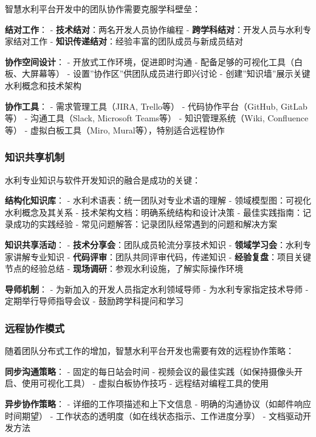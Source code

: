 智慧水利平台开发中的团队协作需要克服学科壁垒：

\textbf{结对工作}： - \textbf{技术结对}：两名开发人员协作编程 -
\textbf{跨学科结对}：开发人员与水利专家结对工作 -
\textbf{知识传递结对}：经验丰富的团队成员与新成员结对

\textbf{协作空间设计}： - 开放式工作环境，促进即时沟通 -
配备足够的可视化工具（白板、大屏幕等） -
设置''协作区''供团队成员进行即兴讨论 -
创建''知识墙''展示关键水利概念和技术架构

\textbf{协作工具}： - 需求管理工具（JIRA, Trello等） -
代码协作平台（GitHub, GitLab等） - 沟通工具（Slack, Microsoft Teams等）
- 知识管理系统（Wiki, Confluence等） - 虚拟白板工具（Miro,
Mural等），特别适合远程协作

\subsubsection{知识共享机制}\label{ux77e5ux8bc6ux5171ux4eabux673aux5236}

水利专业知识与软件开发知识的融合是成功的关键：

\textbf{结构化知识库}： - 水利术语表：统一团队对专业术语的理解 -
领域模型图：可视化水利概念及其关系 -
技术架构文档：明确系统结构和设计决策 - 最佳实践指南：记录成功的实践经验
- 常见问题解答：记录团队经常遇到的问题和解决方案

\textbf{知识共享活动}： - \textbf{技术分享会}：团队成员轮流分享技术知识
- \textbf{领域学习会}：水利专家讲解专业知识 -
\textbf{代码评审}：团队共同评审代码，传递知识 -
\textbf{经验复盘}：项目关键节点的经验总结 -
\textbf{现场调研}：参观水利设施，了解实际操作环境

\textbf{导师机制}： - 为新加入的开发人员指定水利领域导师 -
为水利专家指定技术导师 - 定期举行导师指导会议 - 鼓励跨学科提问和学习

\subsubsection{远程协作模式}\label{ux8fdcux7a0bux534fux4f5cux6a21ux5f0f}

随着团队分布式工作的增加，智慧水利平台开发也需要有效的远程协作策略：

\textbf{同步沟通策略}： - 固定的每日站会时间 -
视频会议的最佳实践（如保持摄像头开启、使用可视化工具） -
虚拟白板协作技巧 - 远程结对编程工具的使用

\textbf{异步协作策略}： - 详细的工作项描述和上下文信息 -
明确的沟通协议（如邮件响应时间期望） -
工作状态的透明度（如在线状态指示、工作进度分享） - 文档驱动开发方法

